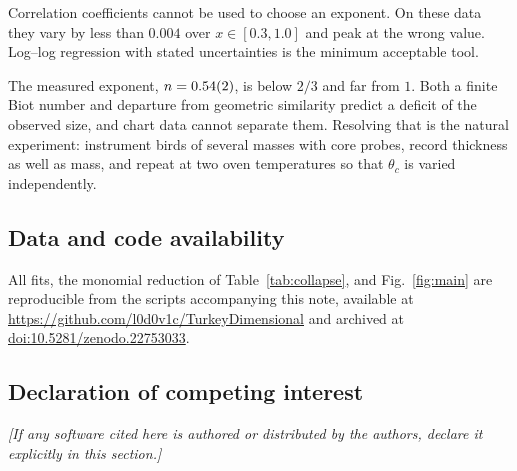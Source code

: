 Correlation coefficients cannot be used to choose an exponent. On these
data they vary by less than $0.004$ over $x\in[0.3,1.0]$ and peak at the
wrong value. Log--log regression with stated uncertainties is the minimum
acceptable tool.

The measured exponent, $n = \num{0.54 \pm 0.02}$, is below $2/3$ and far
from $1$. Both a finite Biot number and departure from geometric
similarity predict a deficit of the observed size, and chart data cannot
separate them. Resolving that is the natural experiment: instrument birds
of several masses with core probes, record thickness as well as mass, and
repeat at two oven temperatures so that $\theta_{c}$ is varied
independently.

\subsection*{Data and code availability}

All fits, the monomial reduction of Table~\ref{tab:collapse}, and
Fig.~\ref{fig:main} are reproducible from the scripts accompanying this
note, available at
\url{https://github.com/l0d0v1c/TurkeyDimensional} and archived at
\href{https://doi.org/10.5281/zenodo.22753033}{doi:10.5281/zenodo.22753033}.

\subsection*{Declaration of competing interest}

\emph{[If any software cited here is authored or distributed by the
authors, declare it explicitly in this section.]}

